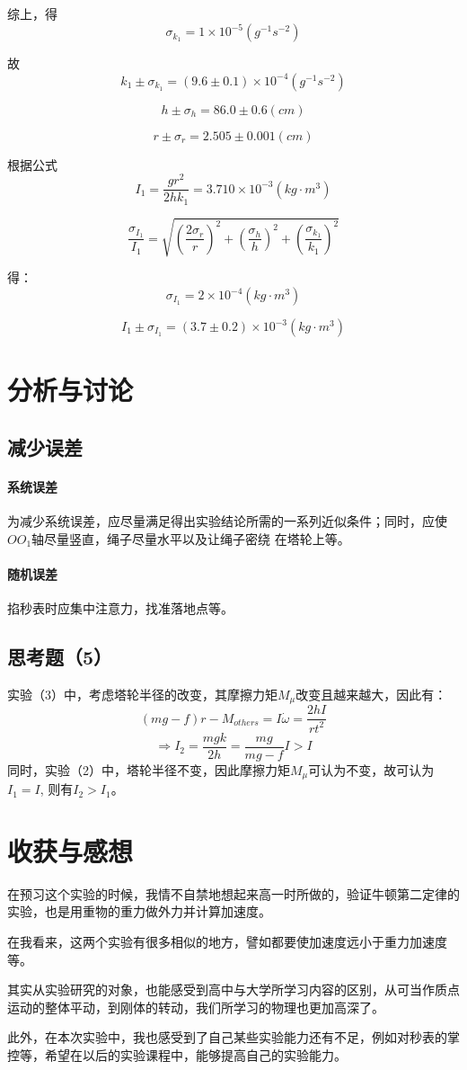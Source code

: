 \documentclass{ctexart}
\begin{document}
      综上，得$$\sigma_{k_1}=1\times10^{-5}(g^{-1}s^{-2})$$

      故$$k_1\pm\sigma_{k_1}=(9.6\pm0.1)\times10^{-4}(g^{-1}s^{-2})$$

      $$h\pm\sigma_h=86.0\pm0.6(cm)$$

      $$r\pm\sigma_r=2.505\pm0.001(cm)$$

      根据公式$$I_1=\frac{gr^2}{2hk_1}=3.710\times10^{-3}(kg\cdot m^3)$$

      $$\frac{\sigma_{I_1}}{I_1}=\sqrt{(\frac{2\sigma_r}{r})^2+(\frac{\sigma_h}{h})^2+(\frac{\sigma_{k_1}}{k_1})^2}$$

      得：$$\sigma_{I_1}=2\times10^{-4}(kg\cdot m^3)$$

      $$I_1\pm\sigma_{I_1}=(3.7\pm0.2)\times10^{-3}(kg\cdot m^3)$$
      
      \section{分析与讨论}
      \subsection{减少误差}
      \paragraph{系统误差}为减少系统误差，应尽量满足得出实验结论所需的一系列近似条件；同时，应使$OO_1$轴尽量竖直，绳子尽量水平以及让绳子密绕
      在塔轮上等。
      \paragraph{随机误差}掐秒表时应集中注意力，找准落地点等。
      \subsection{思考题（5）}
      实验（3）中，考虑塔轮半径的改变，其摩擦力矩$M_{\mu}$改变且越来越大，因此有：
      $$(mg-f)r-M_{others}=I\dot\omega=\frac{2hI}{rt^2}$$
      $$\Rightarrow I_2=\frac{mgk}{2h}=\frac{mg}{mg-f}I>I$$
      同时，实验（2）中，塔轮半径不变，因此摩擦力矩$M_{\mu}$可认为不变，故可认为$I_1=I$,
      则有$I_2>I_1$。
      \section{收获与感想}
      在预习这个实验的时候，我情不自禁地想起来高一时所做的，验证牛顿第二定律的实验，也是用重物的重力做外力并计算加速度。

      在我看来，这两个实验有很多相似的地方，譬如都要使加速度远小于重力加速度等。

      其实从实验研究的对象，也能感受到高中与大学所学习内容的区别，从可当作质点运动的整体平动，到刚体的转动，我们所学习的物理也更加高深了。

      此外，在本次实验中，我也感受到了自己某些实验能力还有不足，例如对秒表的掌控等，希望在以后的实验课程中，能够提高自己的实验能力。
\end{document}

